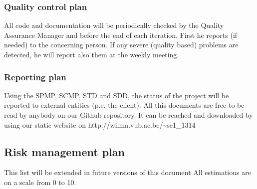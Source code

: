 \documentclass[12pt]{article}
\begin{document}
\subsubsection{Quality control plan}\label{quality-control-plan}

All code and documentation will be periodically checked by the Quality
Assurance Manager and before the end of each iteration. First he reports
(if needed) to the concerning person. If any severe (quality based)
problems are detected, he will report also them at the weekly meeting.

\subsubsection{Reporting plan}\label{reporting-plan}

Using the SPMP, SCMP, STD and SDD, the status of the project will be
reported to external entities (p.e. the client). All this documents are
free to be read by anybody on our Github repository.
It can be reached and downloaded by using our
static website on
http://wilma.vub.ac.be/\textasciitilde{}se1\_1314

\subsection{Risk management plan}\label{risk-management-plan}

This list will be extended in future versions of this document All
estimations are on a scale from 0 to 10.
\end{document}
